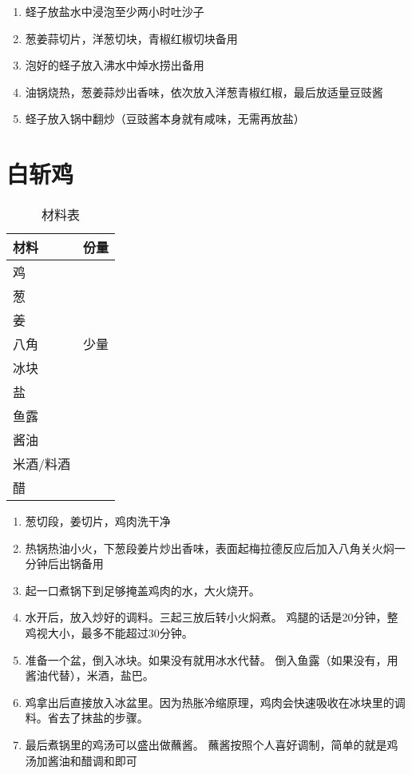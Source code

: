 \begin{enumerate}
    \item 蛏子放盐水中浸泡至少两小时吐沙子
    \item 葱姜蒜切片，洋葱切块，青椒红椒切块备用
    \item 泡好的蛏子放入沸水中焯水捞出备用
    \item 油锅烧热，葱姜蒜炒出香味，依次放入洋葱青椒红椒，最后放适量豆豉酱
    \item 蛏子放入锅中翻炒（豆豉酱本身就有咸味，无需再放盐）
\end{enumerate}


\section{白斩鸡}

\begin{table}[H]
    \centering
    \begin{tabular}{|l||c|}\hline
     \textbf{材料}    &  \textbf{份量}\\ \hline\hline
    鸡   &   \\ \hline
    葱 & \\ \hline
    姜    &   \\ \hline
    八角 & 少量\\ \hline
    冰块 & \\ \hline
    盐 & \\ \hline 
    鱼露 & \\ \hline
    酱油 & \\ \hline
    米酒/料酒 & \\ \hline
    醋 & \\ \hline
    \end{tabular}
    \caption{材料表}
\end{table}

\begin{enumerate}
    \item 葱切段，姜切片，鸡肉洗干净
    \item 热锅热油小火，下葱段姜片炒出香味，表面起梅拉德反应后加入八角关火焖一分钟后出锅备用
    \item 起一口煮锅下到足够掩盖鸡肉的水，大火烧开。
    \item 水开后，放入炒好的调料。三起三放后转小火焖煮。 鸡腿的话是20分钟，整鸡视大小，最多不能超过30分钟。
    \item 准备一个盆，倒入冰块。如果没有就用冰水代替。 倒入鱼露（如果没有，用酱油代替），米酒，盐巴。
    \item 鸡拿出后直接放入冰盆里。因为热胀冷缩原理，鸡肉会快速吸收在冰块里的调料。省去了抹盐的步骤。
    \item 最后煮锅里的鸡汤可以盛出做蘸酱。 蘸酱按照个人喜好调制，简单的就是鸡汤加酱油和醋调和即可
\end{enumerate}

